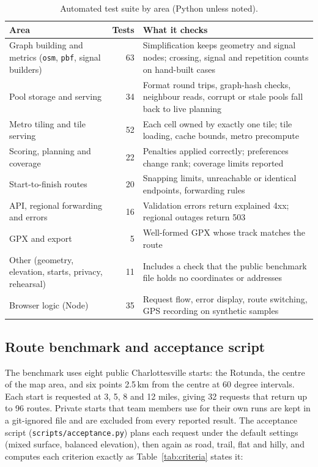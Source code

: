 \begin{table}[ht]
\centering\small
\caption{Automated test suite by area (Python unless noted).}
\label{tab:tests}
\begin{tabularx}{\linewidth}{@{}Y r Y@{}}
\toprule
Area & Tests & What it checks \\
\midrule
Graph building and metrics (\texttt{osm}, \texttt{pbf}, signal builders) & 63 & Simplification keeps geometry and signal nodes; crossing, signal and repetition counts on hand-built cases \\
Pool storage and serving & 34 & Format round trips, graph-hash checks, neighbour reads, corrupt or stale pools fall back to live planning \\
Metro tiling and tile serving & 52 & Each cell owned by exactly one tile; tile loading, cache bounds, metro precompute \\
Scoring, planning and coverage & 22 & Penalties applied correctly; preferences change rank; coverage limits reported \\
Start-to-finish routes & 20 & Snapping limits, unreachable or identical endpoints, forwarding rules \\
API, regional forwarding and errors & 16 & Validation errors return explained 4xx; regional outages return 503 \\
GPX and export & 5 & Well-formed GPX whose track matches the route \\
Other (geometry, elevation, starts, privacy, rehearsal) & 11 & Includes a check that the public benchmark file holds no coordinates or addresses \\
Browser logic (Node) & 35 & Request flow, error display, route switching, GPS recording on synthetic samples \\
\bottomrule
\end{tabularx}
\end{table}

\subsection{Route benchmark and acceptance script}
The benchmark uses eight public Charlottesville starts: the Rotunda, the
centre of the map area, and six points 2.5\,km from the centre at 60 degree
intervals. Each start is requested at 3, 5, 8 and 12 miles, giving 32
requests that return up to 96 routes. Private starts that team members use
for their own runs are kept in a git-ignored file and are excluded from every
reported result. The acceptance script (\texttt{scripts/acceptance.py})
plans each request under the default settings (mixed surface, balanced
elevation), then again as road, trail, flat and hilly, and computes each
criterion exactly as Table~\ref{tab:criteria} states it:

